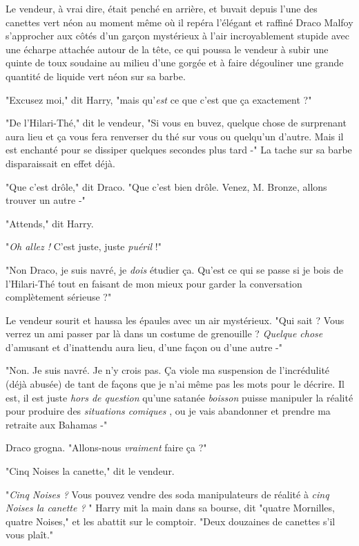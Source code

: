 Le vendeur, à vrai dire, était penché en arrière, et buvait depuis l'une des canettes vert néon au moment même où il repéra l'élégant et raffiné Draco Malfoy s'approcher aux côtés d'un garçon mystérieux à l'air incroyablement stupide avec une écharpe attachée autour de la tête, ce qui poussa le vendeur à subir une quinte de toux soudaine au milieu d'une gorgée et à faire dégouliner une grande quantité de liquide vert néon sur sa barbe.

"Excusez moi," dit Harry, "mais qu'\emph{est}  ce que c'est que ça exactement ?"

"De l'Hilari-Thé," dit le vendeur, "Si vous en buvez, quelque chose de surprenant aura lieu et ça vous fera renverser du thé sur vous ou quelqu'un d'autre. Mais il est enchanté pour se dissiper quelques secondes plus tard -" La tache sur sa barbe disparaissait en effet déjà.

"Que c'est drôle," dit Draco. "Que c'est bien drôle. Venez, M. Bronze, allons trouver un autre -"

"Attends," dit Harry.

"\emph{Oh allez !}  C'est juste, juste \emph{puéril}  !"

"Non Draco, je suis navré, je \emph{dois}  étudier ça. Qu'est ce qui se passe si je bois de l'Hilari-Thé tout en faisant de mon mieux pour garder la conversation complètement sérieuse ?"

Le vendeur sourit et haussa les épaules avec un air mystérieux. "Qui sait ? Vous verrez un ami passer par là dans un costume de grenouille ? \emph{Quelque chose}  d'amusant et d'inattendu aura lieu, d'une façon ou d'une autre -"

"Non. Je suis navré. Je n'y crois pas. Ça viole ma suspension de l'incrédulité (déjà abusée) de tant de façons que je n'ai même pas les mots pour le décrire. Il est, il est juste \emph{hors de question}  qu'une satanée \emph{boisson}  puisse manipuler la réalité pour produire des \emph{situations comiques} , ou je vais abandonner et prendre ma retraite aux Bahamas -"

Draco grogna. "Allons-nous \emph{vraiment}  faire ça ?"

"Cinq Noises la canette," dit le vendeur.

"\emph{Cinq Noises ?}  Vous pouvez vendre des soda manipulateurs de réalité à \emph{cinq Noises la canette ?} " Harry mit la main dans sa bourse, dit "quatre Mornilles, quatre Noises," et les abattit sur le comptoir. "Deux douzaines de canettes s'il vous plaît."

